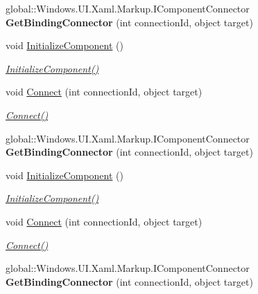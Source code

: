 \begin{DoxyCompactItemize}
global\+::\+Windows.\+U\+I.\+Xaml.\+Markup.\+I\+Component\+Connector {\bfseries Get\+Binding\+Connector} (int connection\+Id, object target)
\item 
void \hyperlink{class_i_v_s_calc_1_1_main_page_a82228985b36d2c45b809d7b2ba489aef}{Initialize\+Component} ()
\begin{DoxyCompactList}\small\item\em \hyperlink{class_i_v_s_calc_1_1_main_page_a82228985b36d2c45b809d7b2ba489aef}{Initialize\+Component()} \end{DoxyCompactList}\item 
void \hyperlink{class_i_v_s_calc_1_1_main_page_a36a7263a9c76a6fdfa392266c3b56122}{Connect} (int connection\+Id, object target)
\begin{DoxyCompactList}\small\item\em \hyperlink{class_i_v_s_calc_1_1_main_page_a36a7263a9c76a6fdfa392266c3b56122}{Connect()} \end{DoxyCompactList}\item 
\mbox{\label{class_i_v_s_calc_1_1_main_page_a1ed5d92cf49cffc51dd1dc959a933f7a}} 
global\+::\+Windows.\+U\+I.\+Xaml.\+Markup.\+I\+Component\+Connector {\bfseries Get\+Binding\+Connector} (int connection\+Id, object target)
\item 
void \hyperlink{class_i_v_s_calc_1_1_main_page_a82228985b36d2c45b809d7b2ba489aef}{Initialize\+Component} ()
\begin{DoxyCompactList}\small\item\em \hyperlink{class_i_v_s_calc_1_1_main_page_a82228985b36d2c45b809d7b2ba489aef}{Initialize\+Component()} \end{DoxyCompactList}\item 
void \hyperlink{class_i_v_s_calc_1_1_main_page_a36a7263a9c76a6fdfa392266c3b56122}{Connect} (int connection\+Id, object target)
\begin{DoxyCompactList}\small\item\em \hyperlink{class_i_v_s_calc_1_1_main_page_a36a7263a9c76a6fdfa392266c3b56122}{Connect()} \end{DoxyCompactList}\item 
\mbox{\label{class_i_v_s_calc_1_1_main_page_a1ed5d92cf49cffc51dd1dc959a933f7a}} 
global\+::\+Windows.\+U\+I.\+Xaml.\+Markup.\+I\+Component\+Connector {\bfseries Get\+Binding\+Connector} (int connection\+Id, object target)
\item 

\end{DoxyCompactItemize}

